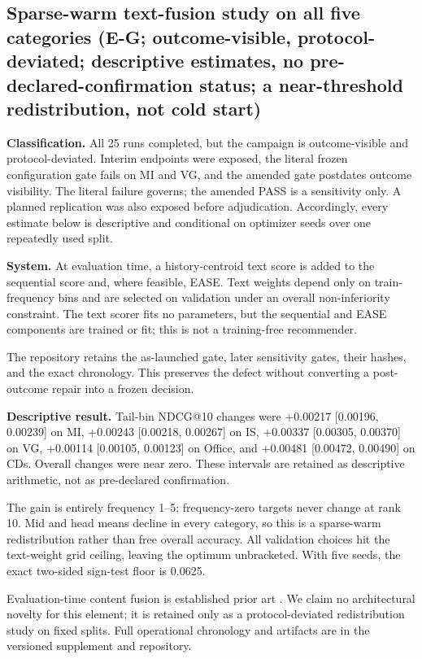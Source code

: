 \subsection{Sparse-warm text-fusion study on all five categories (E-G; outcome-visible, protocol-deviated; descriptive estimates, no pre-declared-confirmation status; a near-threshold redistribution, not cold start)}\label{sec:5.8}

\textbf{Classification.} All 25 runs completed, but the campaign is outcome-visible
and protocol-deviated. Interim endpoints were exposed, the literal frozen
configuration gate fails on MI and VG, and the amended gate postdates outcome
visibility. The literal failure governs; the amended PASS is a sensitivity only. A
planned replication was also exposed before adjudication. Accordingly, every estimate
below is descriptive and conditional on optimizer seeds over one repeatedly used split.

\textbf{System.} At evaluation time, a history-centroid text score is added to the
sequential score and, where feasible, EASE. Text weights depend only on train-frequency
bins and are selected on validation under an overall non-inferiority constraint. The
text scorer fits no parameters, but the sequential and EASE components are trained or
fit; this is not a training-free recommender.

The repository retains the as-launched gate, later sensitivity gates, their hashes,
and the exact chronology. This preserves the defect without converting a post-outcome
repair into a frozen decision.

\textbf{Descriptive result.} Tail-bin NDCG@10 changes were +0.00217 [0.00196,
0.00239] on MI, +0.00243 [0.00218, 0.00267] on IS, +0.00337 [0.00305,
0.00370] on VG, +0.00114 [0.00105, 0.00123] on Office, and +0.00481
[0.00472, 0.00490] on CDs. Overall changes were near zero. These intervals are
retained as descriptive arithmetic, not as pre-declared confirmation.

The gain is entirely frequency 1--5; frequency-zero targets never change at rank 10.
Mid and head means decline in every category, so this is a sparse-warm redistribution
rather than free overall accuracy. All validation choices hit the text-weight grid
ceiling, leaving the optimum unbracketed. With five seeds, the exact two-sided
sign-test floor is 0.0625.

Evaluation-time content fusion is established prior art
\citep{wang2024lmprior,collins2025ensrec,xu2024tedrec,brody2024simrec,
lichtenberg2025denserec,wang2025mmesid,liu2023ucc}. We claim no architectural
novelty for this element; it is retained only as a protocol-deviated redistribution
study on fixed splits. Full operational chronology and artifacts are in the versioned
supplement and repository.
\fi
